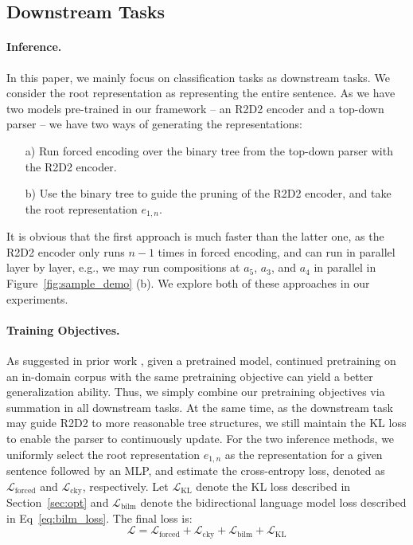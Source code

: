 \subsection{Downstream Tasks}
\label{sec:downstream}
\paragraph{Inference.}
In this paper, we mainly focus on classification tasks as downstream tasks. We consider the root representation as representing the entire sentence.
As we have two models pre-trained in our framework -- an R2D2 encoder and a top-down parser -- we have two ways of generating the representations:
\begin{enumerate}
    \item[a)] Run forced encoding over the binary tree from the top-down parser with the R2D2 encoder.
    \item[b)] Use the binary tree to guide the pruning of the R2D2 encoder, and take the root representation $e_{1,n}$.
\end{enumerate}
It is obvious that the first approach is much faster than the latter one, as the R2D2 encoder only runs $n-1$ times in forced encoding, 
and can run in parallel layer by layer, e.g., we may run compositions at $a_5$, $a_3$, and $a_4$ in parallel in Figure~\ref{fig:sample_demo} (b).
We explore both of these approaches in our experiments.

\paragraph{Training Objectives.}
As suggested in prior work \cite{radford2018improving,howard-ruder-2018-universal,gururangan-etal-2020-dont}, 
given a pretrained model, continued pretraining on an in-domain corpus with the same pretraining objective can yield a better generalization ability.
Thus, we simply combine our pretraining objectives via summation in all downstream tasks. At the same time, as the downstream task may guide R2D2 to more reasonable tree structures, we still maintain the KL loss to enable the parser to continuously update.
For the two inference methods,
we uniformly select the root representation $e_{1,n}$ as the representation for a given sentence followed by an MLP, and estimate the cross-entropy loss, denoted as $\mathcal{L}_\mathrm{forced}$ and $\mathcal{L}_\mathrm{cky}$, respectively. Let $\mathcal{L}_\mathrm{KL}$ denote the KL loss described in Section~\ref{sec:opt} and $\mathcal{L}_\mathrm{bilm}$ denote the bidirectional language model loss described in Eq~\ref{eq:bilm_loss}.
The final loss is:
\begin{equation}
\mathcal{L} = \mathcal{L}_\mathrm{forced} + \mathcal{L}_\mathrm{cky} + \mathcal{L}_\mathrm{bilm} + \mathcal{L}_\mathrm{KL}
\end{equation}